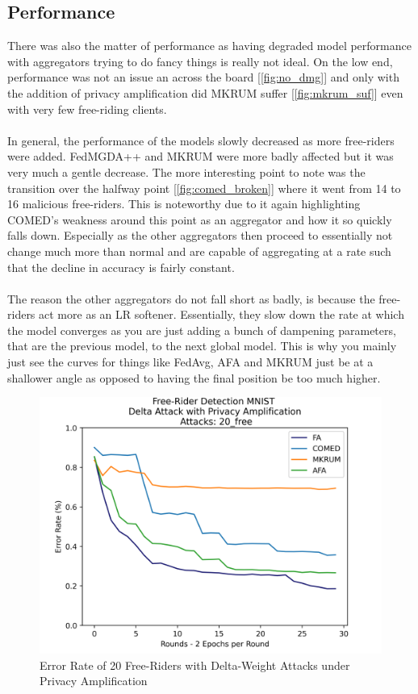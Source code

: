 \subsection{Performance}
There was also the matter of performance as having degraded model performance with aggregators trying to do fancy things is really not ideal.
On the low end, performance was not an issue an across the board [\ref{fig:no_dmg}] and only with the addition of privacy amplification did MKRUM suffer [\ref{fig:mkrum_suf}] even with very few free-riding clients.
\\ \\
In general, the performance of the models slowly decreased as more free-riders were added.
FedMGDA++ and MKRUM were more badly affected but it was very much a gentle decrease.
The more interesting point to note was the transition over the halfway point [\ref{fig:comed_broken}] where it went from 14 to 16 malicious free-riders.
This is noteworthy due to it again highlighting COMED's weakness around this point as an aggregator and how it so quickly falls down.
Especially as the other aggregators then proceed to essentially not change much more than normal and are capable of aggregating at a rate such that the decline in accuracy is fairly constant.
\\ \\
The reason the other aggregators do not fall short as badly, is because the free-riders act more as an LR softener.
Essentially, they slow down the rate at which the model converges as you are just adding a bunch of dampening parameters, that are the previous model, to the next global model.
This is why you mainly just see the curves for things like FedAvg, AFA and MKRUM just be at a shallower angle as opposed to having the final position be too much higher.
\begin{figure}[htbp]
	\centering
    \includegraphics[scale=0.5]{free_riders/graphs/priv20.png}
	\caption{Error Rate of 20 Free-Riders with Delta-Weight Attacks under Privacy Amplification}
	\label{fig:priv20}
\end{figure}

